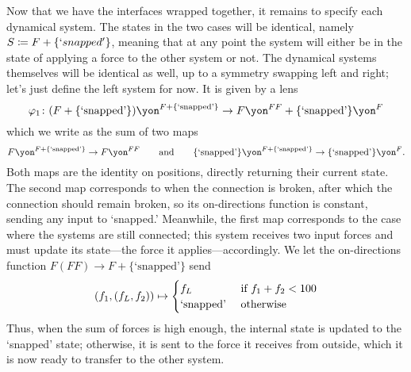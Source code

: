 \documentclass[Book-Poly]{subfiles}
\begin{document}
\begin{example}
Now that we have the interfaces wrapped together, it remains to specify each dynamical system.
The states in the two cases will be identical, namely $S\coloneqq F+\{`snapped'\}$, meaning that at any point the system will either be in the state of applying a force to the other system or not.
The dynamical systems themselves will be identical as well, up to a symmetry swapping left and right; let's just define the left system for now.
It is given by a lens
\[\varphi_1\colon (F+\{\text{`snapped'}\})\yon^{F+\{\text{`snapped'}\}}\to F\yon^{FF}+\{\text{`snapped'}\}\yon^F\]
which we write as the sum of two maps
\[F\yon^{F+\{\text{`snapped'}\}}\to F\yon^{FF} \qqand \{\text{`snapped'}\}\yon^{F+\{\text{`snapped'}\}}\to\{\text{`snapped'}\}\yon^F.\]
Both maps are the identity on positions, directly returning their current state.
The second map corresponds to when the connection is broken, after which the connection should remain broken, so its on-directions function is constant, sending any input to `snapped.'
Meanwhile, the first map corresponds to the case where the systems are still connected; this system receives two input forces and must update its state---the force it applies---accordingly.
We let the on-directions function $F(FF)\to F+\{\text{`snapped'}\}$ send
\[
(f_1,(f_L,f_2))\mapsto
\begin{cases}
	f_L&\textnormal{ if }f_1+f_2<100\\
	\text{`snapped'}&\textnormal{ otherwise}
\end{cases}
\]
Thus, when the sum of forces is high enough, the internal state is updated to the `snapped' state; otherwise, it is sent to the force it receives from outside, which it is now ready to transfer to the other system.
\end{example}
\end{document}
